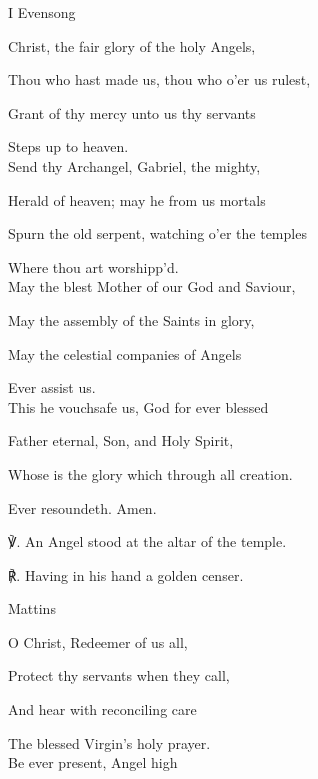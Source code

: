 \begin{paracol}{2}[]
\sloppy
\begin{inhead}
	I Evensong
\end{inhead}
\begin{hangparas}{1.25em}{1}

Christ, the fair glory of the holy Angels,

Thou who hast made us, thou who o'er us rulest,

Grant of thy mercy unto us thy servants

Steps up to heaven.\\

Send thy Archangel, Gabriel, the mighty,

Herald of heaven; may he from us mortals

Spurn the old serpent, watching o'er the temples

Where thou art worshipp'd.\\

May the blest Mother of our God and Saviour,

May the assembly of the Saints in glory,

May the celestial companies of Angels

Ever assist us.\\

This he vouchsafe us, God for ever blessed

Father eternal, Son, and Holy Spirit,

Whose is the glory which through all creation.

Ever resoundeth. Amen.\\
\end{hangparas}

    ℣. An Angel stood at the altar of the temple.

	℟. Having in his hand a golden censer.
	
	\switchcolumn
	
\begin{inhead}
	Mattins
\end{inhead}
\begin{hangparas}{1.25em}{1}
O Christ, Redeemer of us all,

Protect thy servants when they call,

And hear with reconciling care

The blessed Virgin's holy prayer.\\

Be ever present, Angel high


\end{hangparas}
\end{paracol}
